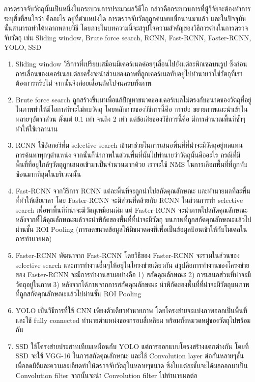 การตรวจจับวัตถุนั้นเป็นหนึ่งในกระบวนการประมวผลวิดีโอ กล่าวคือกระบวนการที่ผู้วิจัยจะต้องทำการระบุสิ่งที่สนใจว่า คืออะไร อยู่ที่ตำแหน่งใด การตรวจจับวัตถุถูกค้นพบเมื่อนานมาแล้ว 
และในปัจจุบันนั้นสามารถทำได้หลากหลายวิธี โดยภายในบทความนี้จะสรุปใจความสำคัญของวิธีการต่างในการตรวจจับวัตถุ เช่น Sliding window, Brute force search, RCNN, 
Fast-RCNN, Faster-RCNN, YOLO, SSD 
\begin{enumerate}
	\item Sliding window\textsuperscript{\cite{object_detect}} วิธีการที่เปรียบเสมือนมีเคอร์เนลค่อยๆเลื่อนไปยังแต่ละพิกเซลบนรูป ซึ่งก่อนการเลื่อนของเคอร์เนลแต่ละครั้งจะนำส่วนของภาพที่ถูกเคอร์เนลทับอยู่ไปทำนายว่าใช่วัตถุที่เราต้องการหรือไม่ 
	จากนั้นจึงค่อยเลื่อนถัดไปจนครบทั้งภาพ
	\item Brute force search\textsuperscript{\cite{object_detect}} ถูกสร้างขึ้นมาเพื่อแก้ปัญหาขนาดของเคอร์เนลไม่ตรงกับขนาดของวัตถุที่อยู่ในภาพทำให้มีโอกาสที่จะไม่พบวัตถุ โดยหลักการของวิธีการนี้คือ 
	การย่อ-ขยายภาพและนำเข้าในหลายๆอัตราส่วน ตั้งแต่ 0.1 เท่า จนถึง 2 เท่า แต่ข้อเสียของวิธีการนี้คือ มีการคำนวณพื้นที่ซ้ำๆทำให้ใช้เวลานาน
	\item RCNN\textsuperscript{\cite{object_detect}} ใช้อัลกอริทึ่ม selective search เข้ามาช่วยในการเสนอพื้นที่ที่น่าจะมีวัตถุอยู่ทดแทนการค้นหาทุกๆตำแหน่ง จากนั้นก็นำภาพในส่วนพื้นที่นั้นไปทำนายว่าวัตถุนั้นคืออะไร 
	กรณีที่มีพื้นที่ที่อยู่ใกล้ๆวัตถุถูกเสนอเข้ามาเป็นจำนวนมากด้วย เราจะใช้ NMS ในการเลือกพื้นที่ที่ถูกทับซ้อนมากที่สุดในบริเวณนั้น
	\item Fast-RCNN\textsuperscript{\cite{nms}} จากวิธีการ RCNN แต่ละพื้นที่จะถูกนำไปสกัดคุณลักษณะ และทำนายผลทีละพื้นที่่ทำให้เสียเวลา โดย Faster-RCNN จะมีส่วนที่คล้ายกับ RCNN ในส่วนการทำ 
	selective search เพื่อหาพื้นที่ที่น่าจะมีวัตถุเหมือนเดิม แต่ Faster-RCNN จะนำภาพไปสกัดคุณลักษณะ หลังจากที่ได้คุณลักษณะแล้วจะนำพิกัดของพื้นที่ที่น่าจะมีวัตถุ 
	บนภาพที่ถูกสกัดคุณลักษณะแล้วไปผ่านชั้น ROI Pooling (การลดขนาดข้อมูลให้มีขนาดคงที่เพื่อเป็นข้อมูลป้อนเข้าให้กับโมเดลในการทำนายผล)
	\item Faster-RCNN พัฒนาจาก Fast-RCNN โดยวิธีของ Faster-RCNN จะรวมในส่วนของ selective search และการทำงานอื่นๆให้อยู่ในโครงข่ายเดียวกัน 
	สรุปคือการทำงานของโครงข่ายของ Faster-RCNN จะมีการทำงานสามอย่างคือ 1) สกัดคุณลักษณะ 2) การเสนอส่วนที่น่าจะมีวัตถุอยู่ในภาพ 3) หลังจากได้ภาพจากการสกัดคุณลักษณะ 
	นำพิกัดของพื้นที่ที่น่าจะมีวัตถุบนภาพที่ถูกสกัดคุณลักษณะแล้วไปผ่านชั้น ROI Pooling
	\item YOLO เป็นวิธีการที่ใช้ CNN เพียงตัวเดียวทำนายภาพ โดยโครงข่ายจะแบ่งภาพออกเป็นพื้นที่ และใช้ fully connected ทำนายตำแหน่งของกรอบสี่เหลี่ยม 
	พร้อมทั้งหมวดหมู่ของวัตถุไปพร้อมกัน 
	\item SSD ใช้โครงข่ายประสาทเทียมเหมือนกับ YOLO แต่การออกแบบโครงสร้างแตกต่างกัน โดยที่ SSD จะใช้ VGG-16 ในการสกัดคุณลักษณะ และใช้ Convolution layer 
	ต่อกันหลายๆชั้นเพื่อลดมิติและความละเอียดทำให้ตรวจจับวัตถุในหลายๆขนาด ซึ่งในแต่ละชั้นจะได้ผลออกมาเป็น Convolution filter จากนั้นจะนำ Convolution filter ไปทำนายผลต่อ
\end{enumerate}